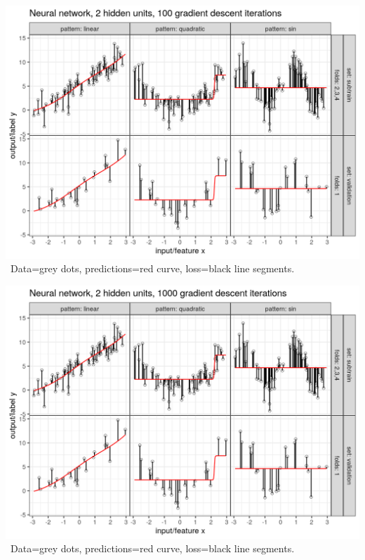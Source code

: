 \begin{frame}
  \includegraphics[width=\textwidth]{figure-overfitting-pred-units=2-maxit=100.png}
\
Data=grey dots, predictions=red curve, loss=black line segments.
\end{frame}


\begin{frame}
  \includegraphics[width=\textwidth]{figure-overfitting-pred-units=2-maxit=1000.png}
\
Data=grey dots, predictions=red curve, loss=black line segments.
\end{frame}


